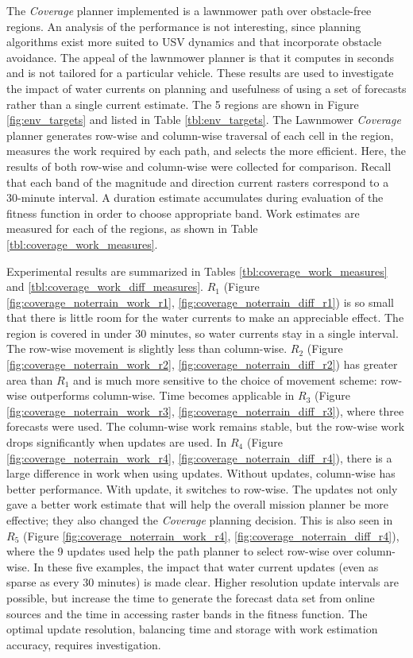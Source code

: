 \documentclass{tamuccthesis}
\begin{document}
The \textit{Coverage} planner implemented is a lawnmower path over obstacle-free regions. An analysis of the performance is not interesting, since planning algorithms exist more suited to USV dynamics and that incorporate obstacle avoidance. The appeal of the lawnmower planner is that it computes in seconds and is not tailored for a particular vehicle. These results are used to investigate the impact of water currents on planning and usefulness of using a set of forecasts rather than a single current estimate. The 5 regions are shown in Figure \ref{fig:env_targets} and listed in Table \ref{tbl:env_targets}. The Lawnmower \textit{Coverage} planner generates row-wise and column-wise traversal of each cell in the region, measures the work required by each path, and selects the more efficient. Here, the results of both row-wise and column-wise were collected for comparison. Recall that each band of the magnitude and direction current rasters correspond to a 30-minute interval. A duration estimate accumulates during evaluation of the fitness function in order to choose appropriate band. Work estimates are measured for each of the regions, as shown in Table \ref{tbl:coverage_work_measures}. 

Experimental results are summarized in Tables \ref{tbl:coverage_work_measures} and \ref{tbl:coverage_work_diff_measures}. $R_1$ (Figure \ref{fig:coverage_noterrain_work_r1}, \ref{fig:coverage_noterrain_diff_r1}) is so small that there is little room for the water currents to make an appreciable effect. The region is covered in under 30 minutes, so water currents stay in a single interval. The row-wise movement is slightly less than column-wise. $R_2$ (Figure \ref{fig:coverage_noterrain_work_r2}, \ref{fig:coverage_noterrain_diff_r2}) has greater area than $R_1$ and is much more sensitive to the choice of movement scheme: row-wise outperforms column-wise. Time becomes applicable in $R_3$ (Figure \ref{fig:coverage_noterrain_work_r3}, \ref{fig:coverage_noterrain_diff_r3}), where three forecasts were used. The column-wise work remains stable, but the row-wise work drops significantly when updates are used. In $R_4$ (Figure \ref{fig:coverage_noterrain_work_r4}, \ref{fig:coverage_noterrain_diff_r4}), there is a large difference in work when using updates. Without updates, column-wise has better performance. With update, it switches to row-wise. The updates not only gave a better work estimate that will help the overall mission planner be more effective; they also changed the \textit{Coverage} planning decision. This is also seen in $R_5$ (Figure \ref{fig:coverage_noterrain_work_r4}, \ref{fig:coverage_noterrain_diff_r4}), where the 9 updates used help the path planner to select row-wise over column-wise. In these five examples, the impact that water current updates (even as sparse as every 30 minutes) is made clear. Higher resolution update intervals are possible, but increase the time to generate the forecast data set from online sources and the time in accessing raster bands in the fitness function. The optimal update resolution, balancing time and storage with work estimation accuracy, requires investigation.
\end{document}
